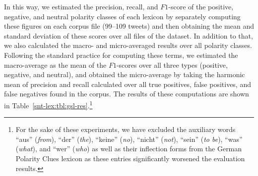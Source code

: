 In this way, we estimated the precision, recall, and $F1$-score of the
positive, negative, and neutral polarity classes of each lexicon by
separately computing these figures on each corpus file (99--109
tweets) and then obtaining the mean and standard deviation of these
scores over all files of the dataset.  In addition to that, we also
calculated the macro- and micro-averaged results over all polarity
classes.  Following the standard practice for computing these terms,
we estimated the macro-average as the mean of the $F1$-scores over all
three types (positive, negative, and neutral), and obtained the
micro-average by taking the harmonic mean of precision and recall
calculated over all true positives, false positives, and false
negatives found in the corpus.  The results of these computations are
shown in Table~\ref{snt-lex:tbl:gsl-res}.\footnote{For the sake of
  these experiments, we have excluded the auxiliary words ``aus''
  (\emph{from}), ``der'' (\emph{the}), ``keine'' (\emph{no}),
  ``nicht'' (\emph{not}), ``sein'' (\emph{to be}), ``was''
  (\emph{what}), and ``wer'' (\emph{who}) as well as their inflection
  forms from the German Polarity Clues lexicon as these entries
  significantly worsened the evaluation results.}

